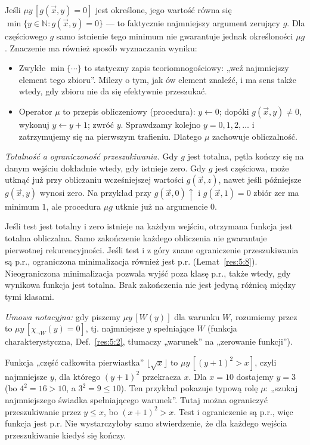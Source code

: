 \begin{uwaga}\label{res:5:6}
Jeśli $\mu y\,[g(\vec x,y)=0]$ jest określone, jego wartość równa się $\min\{y\in\mathbb N:g(\vec x,y)=0\}$ --- to faktycznie najmniejszy argument zerujący $g$. Dla częściowego $g$ samo istnienie tego minimum nie gwarantuje jednak określoności $\mu g$. Znaczenie ma również sposób wyznaczania wyniku:
\begin{itemize}
\item Zwykłe $\min\{\cdots\}$ to statyczny zapis teoriomnogościowy: „weź najmniejszy element tego zbioru”. Milczy o tym, jak ów element znaleźć, i ma sens także wtedy, gdy zbioru nie da się efektywnie przeszukać.
\item Operator $\mu$ to przepis obliczeniowy (procedura): $y\gets0$; dopóki $g(\vec x,y)\ne0$, wykonuj $y\gets y+1$; zwróć $y$. Sprawdzamy kolejno $y=0,1,2,\ldots$ i zatrzymujemy się na pierwszym trafieniu. Dlatego $\mu$ zachowuje obliczalność.
\end{itemize}
\emph{Totalność a ograniczoność przeszukiwania.} Gdy $g$ jest totalna, pętla kończy się na danym wejściu dokładnie wtedy, gdy istnieje zero. Gdy $g$ jest częściowa, może utknąć już przy obliczaniu wcześniejszej wartości $g(\vec x,z)$, nawet jeśli późniejsze $g(\vec x,y)$ wynosi zero. Na przykład przy $g(\vec x,0)\uparrow$ i $g(\vec x,1)=0$ zbiór zer ma minimum $1$, ale procedura $\mu g$ utknie już na argumencie $0$.

Jeśli test jest totalny i zero istnieje na każdym wejściu, otrzymana funkcja jest totalna obliczalna. Samo zakończenie każdego obliczenia nie gwarantuje pierwotnej rekurencyjności. Jeśli test i z góry znane ograniczenie przeszukiwania są p.r., ograniczona minimalizacja również jest p.r. (Lemat~\ref{res:5:8}). Nieograniczona minimalizacja pozwala wyjść poza klasę p.r., także wtedy, gdy wynikowa funkcja jest totalna. Brak zakończenia nie jest jedyną różnicą między tymi klasami.

\emph{Umowa notacyjna:} gdy piszemy $\mu y\,[W(y)]$ dla warunku $W$, rozumiemy przez to $\mu y\,[\chi_{\neg W}(y)=0]$, tj. najmniejsze $y$ spełniające $W$ (funkcja charakterystyczna, Def.~\ref{res:5:2}, tłumaczy „warunek” na „zerowanie funkcji”).
\end{uwaga}

\begin{przyklad}\label{res:5:7}
Funkcja „część całkowita pierwiastka” $\lfloor\sqrt x\rfloor$ to $\mu y\,[(y+1)^2>x]$, czyli najmniejsze $y$, dla którego $(y+1)^2$ przekracza $x$. Dla $x=10$ dostajemy $y=3$ (bo $4^2=16>10$, a $3^2=9\le10$). Ten przykład pokazuje typową rolę $\mu$: „szukaj najmniejszego świadka spełniającego warunek”. Tutaj można ograniczyć przeszukiwanie przez $y\le x$, bo $(x+1)^2>x$. Test i ograniczenie są p.r., więc funkcja jest p.r. Nie wystarczyłoby samo stwierdzenie, że dla każdego wejścia przeszukiwanie kiedyś się kończy.
\end{przyklad}

